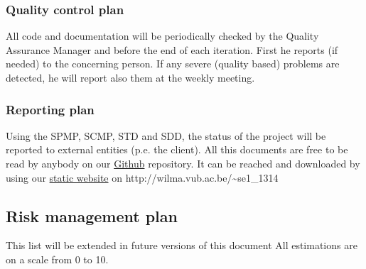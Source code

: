 \documentclass[9pt]{article}
\begin{document}
\subsubsection{Quality control plan}\label{quality-control-plan}

All code and documentation will be periodically checked by the Quality
Assurance Manager and before the end of each iteration. First he reports
(if needed) to the concerning person. If any severe (quality based)
problems are detected, he will report also them at the weekly meeting.

\subsubsection{Reporting plan}\label{reporting-plan}

Using the SPMP, SCMP, STD and SDD, the status of the project will be
reported to external entities (p.e. the client). All this documents are
free to be read by anybody on our \hyperref[Github]{Github} repository.
It can be reached and downloaded by using our
\href{http://wilma.vub.ac.be/~se1_1314}{static website} on
http://wilma.vub.ac.be/\textasciitilde{}se1\_1314

\subsection{Risk management plan}\label{risk-management-plan}

This list will be extended in future versions of this document All
estimations are on a scale from 0 to 10.
\end{document}

